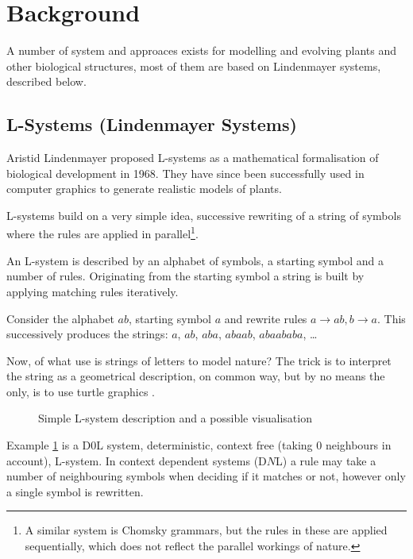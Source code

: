 
\section{Background}


    A number of system and approaces exists for modelling and evolving
    plants and other biological structures, most of them are based on
    Lindenmayer systems, described below. 


\subsection{L-Systems (Lindenmayer Systems)}

\label{lindenmayer}

    Aristid Lindenmayer proposed L-systems as a mathematical
    formalisation of biological development in 1968. They have since
    been successfully used in computer graphics to generate realistic
    models of plants. 

    L-systems build on a very simple idea, successive rewriting of a
    string of symbols where the rules are applied in
    parallel\footnote{A similar system is Chomsky grammars, but the
    rules in these are applied sequentially, which does not reflect
    the parallel workings of nature.}.

    An L-system is described by an alphabet of symbols, a starting
    symbol and a number of rules. Originating from the starting symbol
    a string is built by applying matching rules iteratively.

    Consider the alphabet ${ab}$, starting symbol $a$ and rewrite
    rules ${a\rightarrow ab, b\rightarrow a}$. This successively produces the strings: 
    $a$, $ab$, $aba$, $abaab$, $abaababa$, \ldots 

    Now, of what use is strings of letters to model nature?
    The trick is to interpret the string as a geometrical description,
    on common way, but by no means the only, is to use turtle graphics
    \cite{turtle}.


\begin{figure}[h]

\caption{Simple L-system description and a possible visualisation}
\label{lsys-example}
\end{figure}
    
    Example \ref{lsys-example} is a D0L system, deterministic, context free
    (taking 0 neighbours in account), L-system. In context dependent
    systems (D$N$L) a rule may take a number of neighbouring symbols
    when deciding if it matches or not, however only a single symbol
    is rewritten.


